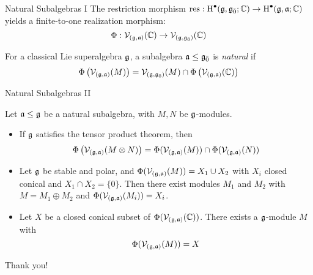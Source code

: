 \documentclass{beamer}
\begin{document}
\begin{frame}{Natural Subalgebras I}
\pause
  The restriction morphism $\operatorname{res}: \operatorname{H}^\bullet(\mathfrak{g},{\mathfrak{g}}_{\bar{0}};\mathbb{C}) \to \operatorname{H}^\bullet(\mathfrak{g},\mathfrak{a};\mathbb{C})$ yields a finite-to-one realization morphism:
  \[
    \Phi: \mathcal{V}_{(\mathfrak{g},\mathfrak{a})}(\mathbb{C}) \to \mathcal{V}_{(\mathfrak{g},{\mathfrak{g}}_{\bar{0}})}(\mathbb{C})
  \]
  \pause
  \begin{definition}
    For a classical Lie superalgebra $\mathfrak{g}$, a subalgebra $\mathfrak{a} \leq {\mathfrak{g}}_{\bar{0}}$ is \emph{natural} if
    \[
      \Phi\left(\mathcal{V}_{(\mathfrak{g},\mathfrak{a})}(M)\right) = \mathcal{V}_{(\mathfrak{g},{\mathfrak{g}}_{\bar{0}})}(M) \cap \Phi\left(\mathcal{V}_{(\mathfrak{g},\mathfrak{a})}(\mathbb{C})\right)
    \]
    
  \end{definition}
\end{frame}

\begin{frame}{Natural Subalgebras II}
  \pause
  \begin{theorem}
    Let $\mathfrak{a} \leq \mathfrak{g}$ be a natural subalgebra, with $M, N$ be $\mathfrak{g}$-modules.
    \begin{itemize}
      \pause
    \item If $\mathfrak{g}$ satisfies the tensor product theorem, then
      \[
        \Phi\left(\mathcal{V}_{(\mathfrak{g},\mathfrak{a})}(M \otimes N)\right) = \Phi(\mathcal{V}_{(\mathfrak{g},\mathfrak{a})}(M)) \cap \Phi(\mathcal{V}_{(\mathfrak{g},\mathfrak{a})}(N))
      \]
      \pause
    \item Let $\mathfrak{g}$ be stable and polar, and $\Phi(\mathcal{V}_{(\mathfrak{g},\mathfrak{a})}(M)) = X_1 \cup X_2$ with $X_i$ closed conical and $X_1 \cap X_2 = \{0\}$. Then there exist modules $M_1$ and $M_2$ with $M = M_1 \oplus M_2$ and $\Phi(\mathcal{V}_{(\mathfrak{g},\mathfrak{a})}(M_i)) = X_i$.
      \pause
    \item Let $X$ be a closed conical subset of $\Phi(\mathcal{V}_{(\mathfrak{g},\mathfrak{a})}(\mathbb{C}))$. There exists a $\mathfrak{g}$-module $M$ with
      \[
        \Phi(\mathcal{V}_{(\mathfrak{g},\mathfrak{a})}(M)) = X
      \]
      
    \end{itemize}
  \end{theorem}
\end{frame}

\title[HBD Sarah]{}
\begin{frame}
  \centering
  \Huge Thank you!
\end{frame}
\end{document}
